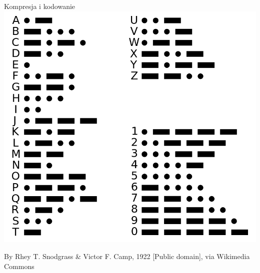 \documentclass{beamer}
\begin{document}
\begin{frame}{Kompresja i kodowanie}
\centering\includegraphics[width=.7\textwidth]{morse.png}

{\tiny By Rhey T. Snodgrass \& Victor F. Camp, 1922 [Public domain], via Wikimedia Commons}
\end{frame}

\end{document}
